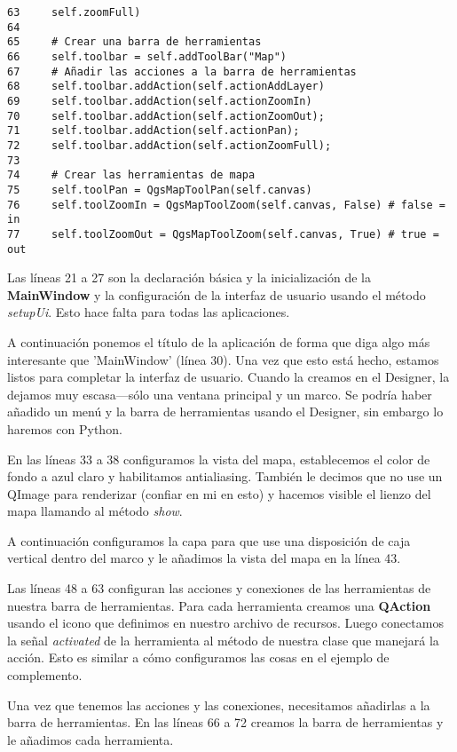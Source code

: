 \begin{verbatim}
63     self.zoomFull)
64 
65     # Crear una barra de herramientas
66     self.toolbar = self.addToolBar("Map")
67     # Añadir las acciones a la barra de herramientas
68     self.toolbar.addAction(self.actionAddLayer)
69     self.toolbar.addAction(self.actionZoomIn)
70     self.toolbar.addAction(self.actionZoomOut);
71     self.toolbar.addAction(self.actionPan);
72     self.toolbar.addAction(self.actionZoomFull);
73 
74     # Crear las herramientas de mapa
75     self.toolPan = QgsMapToolPan(self.canvas)
76     self.toolZoomIn = QgsMapToolZoom(self.canvas, False) # false = in
77     self.toolZoomOut = QgsMapToolZoom(self.canvas, True) # true = out
\end{verbatim}

Las líneas 21 a 27 son la declaración básica y la inicialización de la \textbf{MainWindow}
y la configuración de la interfaz de usuario usando el método \textsl{setupUi}. Esto hace
falta para todas las aplicaciones.

A continuación ponemos el título de la aplicación de forma que diga algo más interesante que 'MainWindow' 
(línea 30). Una vez que esto está hecho, estamos listos para completar la interfaz de usuario. Cuando la 
creamos en el Designer, la dejamos muy escasa---sólo una ventana principal y un marco. Se podría haber añadido 
un menú y la barra de herramientas usando el Designer, sin embargo lo haremos con Python.

En las líneas 33 a 38 configuramos la vista del mapa, establecemos el color de fondo a azul claro y habilitamos 
antialiasing. También le decimos que no use un QImage para renderizar (confiar en mi en esto) y hacemos visible 
el lienzo del mapa llamando al método \textsl{show}.

A continuación configuramos la capa para que use una disposición de caja vertical dentro del marco y le 
añadimos la vista del mapa en la línea 43.

Las líneas 48 a 63 configuran las acciones y conexiones de las herramientas de nuestra barra de herramientas. 
Para cada herramienta creamos una \textbf{QAction} usando el icono que definimos en nuestro archivo de recursos. 
Luego conectamos la señal \textsl{activated} de la herramienta al método de nuestra clase que manejará la acción. 
Esto es similar a cómo configuramos las cosas en el ejemplo de complemento.

Una vez que tenemos las acciones y las conexiones, necesitamos añadirlas a la barra de herramientas. En las 
líneas 66 a 72 creamos la barra de herramientas y le añadimos cada herramienta.

